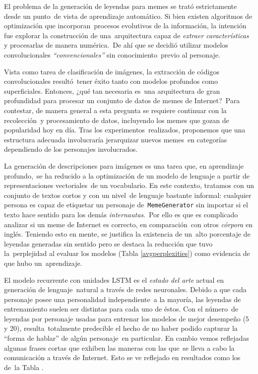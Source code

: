 \noindent
El problema de la generación de leyendas para memes se trató estrictamente desde un punto\
de vista de aprendizaje automático. Si bien existen algoritmos de optimización que incorporan\
procesos evolutivos de la información, la intención fue explorar la construcción de una\
arquitectura capaz de \emph{extraer características} y procesarlas de manera numérica.\
De ahí que se decidió utilizar modelos convolucionales \emph{``convencionales''} sin conocimiento\
previo al personaje.\par
Vista como tarea de clasificación de imágenes, la extracción de códigos convolucionales resultó\
tener éxito tanto con modelos profundos como superficiales. Entonces, ¿qué tan necesaria es\
una arquitectura de gran profundidad para procesar un conjunto de datos de memes de Internet?\
Para contestar, de manera general a esta pregunta se requiere continuar con la recolección\
y procesamiento de datos, incluyendo los memes que gozan de popularidad hoy en día. Tras los experimentos\
realizados, proponemos que una estructura adecuada involucraría jerarquizar nuevos memes\
en categorías dependiendo de los personajes involucrados.\par
La generación de descripciones para imágenes es una tarea que, en aprendizaje profundo,\
se ha reducido a la optimización de un modelo de lenguaje a partir de representaciones vectoriales\
de un vocabulario. En este contexto, tratamos con un conjunto de textos cortos y con un nivel\
de lenguaje bastante informal: cualquier persona es capaz de etiquetar un personaje de\
\verb+MemeGenerator+ sin importar si el texto hace sentido para los demás \emph{internautas}.\
Por ello es que es complicado analizar si un meme de Internet es correcto, en comparación\
con otros \emph{córpora} en inglés. Teniendo esto en mente, se justifica la existencia de un\
alto porcentaje de leyendas generadas sin sentido pero se destaca la reducción que tuvo la\
perplejidad al evaluar los modelos (Tabla \ref{avgperplexities}) como evidencia de que hubo un\
aprendizaje.\par
El modelo recurrente con unidades LSTM es el \emph{estado del arte} actual en generación de lenguaje\
natural a través de redes neuronales. Debido a que cada personaje posee una personalidad independiente\
a la mayoría, las leyendas de entrenamiento suelen ser distintas para cada uno de éstos. Con el número\
de leyendas por personaje usadas para entrenar los modelos de mejor desempeño (5 y 20), resulta\
totalmente predecible el hecho de no haber podido capturar la ``forma de hablar'' de algún personaje\
en particular. En cambio vemos reflejadas algunas frases cortas que exhiben las maneras con las que\
se lleva a cabo la comunicación a través de Internet. Esto se ve reflejado en resultados como los de\
la Tabla \label{exp6-anec}.

